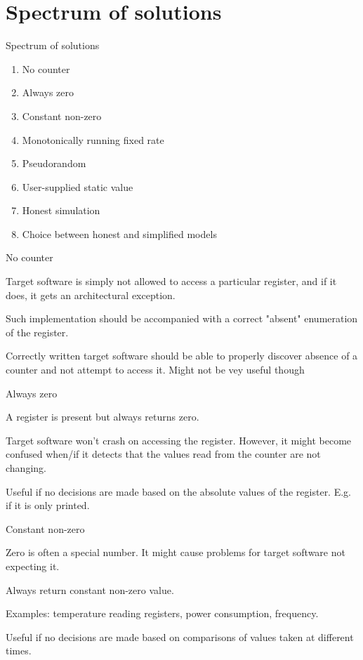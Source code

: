 \section{Spectrum of solutions}

\begin{frame}{Spectrum of solutions}

\begin{enumerate}
\item No counter
\item Always zero
\item Constant non-zero
\item Monotonically running fixed rate
\item Pseudorandom 
\item User-supplied static value
\item Honest simulation 
\item Choice between honest and simplified models
\end{enumerate}

\end{frame}

\begin{frame}{No counter}

Target software is simply not allowed to access a particular register, and if it does, it gets an architectural exception. 
  
Such implementation should be accompanied with a correct "absent" enumeration of the register.

Correctly written target software should be able to properly discover absence of a counter and not attempt to access it. Might not be vey useful though

\end{frame}

\begin{frame}{Always zero}

A register is present but always returns zero. 

Target software won't crash on accessing the register. However, it might become confused when/if
it detects that the values read from the counter are not changing. 

Useful if no decisions are made based on the absolute values of the register. E.g. if it is only printed.

\end{frame}


\begin{frame}{Constant non-zero}

Zero is often a special number. It might cause problems for target software not expecting it.

Always return constant non-zero value.

Examples: temperature reading registers, power consumption, frequency.

Useful if no decisions are made based on comparisons of values taken at different times. 

\end{frame}
  
